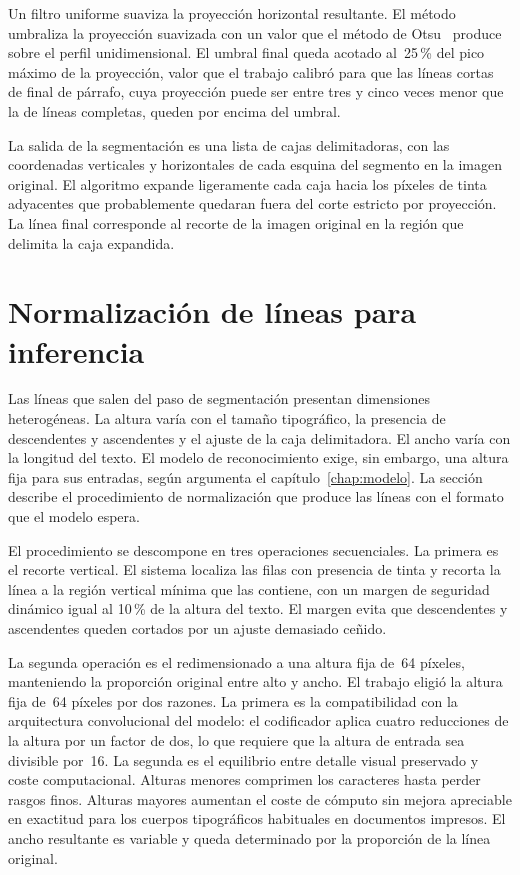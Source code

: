 Un filtro uniforme suaviza la proyección horizontal resultante. El método umbraliza la proyección suavizada con un valor que el método de Otsu~\cite{otsu1979threshold} produce sobre el perfil unidimensional. El umbral final queda acotado al~25\,\% del pico máximo de la proyección, valor que el trabajo calibró para que las líneas cortas de final de párrafo, cuya proyección puede ser entre tres y cinco veces menor que la de líneas completas, queden por encima del umbral.

La salida de la segmentación es una lista de cajas delimitadoras, con las coordenadas verticales y horizontales de cada esquina del segmento en la imagen original. El algoritmo expande ligeramente cada caja hacia los píxeles de tinta adyacentes que probablemente quedaran fuera del corte estricto por proyección. La línea final corresponde al recorte de la imagen original en la región que delimita la caja expandida.

\section{Normalización de líneas para inferencia}
\label{sec:normalizacion-lineas}

Las líneas que salen del paso de segmentación presentan dimensiones heterogéneas. La altura varía con el tamaño tipográfico, la presencia de descendentes y ascendentes y el ajuste de la caja delimitadora. El ancho varía con la longitud del texto. El modelo de reconocimiento exige, sin embargo, una altura fija para sus entradas, según argumenta el capítulo~\ref{chap:modelo}. La sección describe el procedimiento de normalización que produce las líneas con el formato que el modelo espera.

El procedimiento se descompone en tres operaciones secuenciales. La primera es el recorte vertical. El sistema localiza las filas con presencia de tinta y recorta la línea a la región vertical mínima que las contiene, con un margen de seguridad dinámico igual al 10\,\% de la altura del texto. El margen evita que descendentes y ascendentes queden cortados por un ajuste demasiado ceñido.

La segunda operación es el redimensionado a una altura fija de~64 píxeles, manteniendo la proporción original entre alto y ancho. El trabajo eligió la altura fija de~64 píxeles por dos razones. La primera es la compatibilidad con la arquitectura convolucional del modelo: el codificador aplica cuatro reducciones de la altura por un factor de dos, lo que requiere que la altura de entrada sea divisible por~16. La segunda es el equilibrio entre detalle visual preservado y coste computacional. Alturas menores comprimen los caracteres hasta perder rasgos finos. Alturas mayores aumentan el coste de cómputo sin mejora apreciable en exactitud para los cuerpos tipográficos habituales en documentos impresos. El ancho resultante es variable y queda determinado por la proporción de la línea original.

